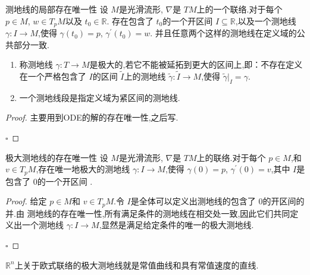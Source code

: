 \documentclass[../../几何与拓扑.tex]{subfiles}
\begin{document}
\begin{theorem}{测地线的局部存在唯一性}
    设 \(  M  \)是光滑流形, \(   \nabla   \)是 \(  TM  \)上的一个联络.对于每个 \(  p \in M  \), \(  w \in T_{p}M  \)以及 \(  t_0 \in \mathbb{R}   \).
    存在包含了 \(  t_0  \)的一个开区间 \(  I\subseteq \mathbb{R}   \),以及一个测地线 \(   \gamma :I\to M  \),使得 \(   \gamma \left( t_0 \right)= p   \), \(   \gamma ^{\prime} \left( t_0 \right)= w   \).
    并且任意两个这样的测地线在定义域的公共部分一致.           
\end{theorem}


\begin{definition}
    \begin{enumerate}
        \item 称测地线 \(   \gamma :T\to M  \)是极大的,若它不能被延拓到更大的区间上,即：不存在定义在一个严格包含了 \(  I  \)的区间 \(  \tilde{I}  \)上的测地线 \(   \tilde{\gamma} : \tilde{I}\to M  \),使得
         \(   \tilde{\gamma} |_{I} =   \gamma   \).
         \item 一个测地线段是指定义域为紧区间的测地线.     
    \end{enumerate}
    
\end{definition}

\begin{proof}
    主要用到ODE的解的存在唯一性,之后写.

    \hfill $\square$
\end{proof}


\begin{corollary}{极大测地线的存在唯一性}
    设 \(  M  \)是光滑流形, \(   \nabla   \)是 \(  TM  \)上的联络.对于每个 \(  p \in M  \),和 \(  v \in T_{p}M  \),存在唯一地极大的测地线 \(   \gamma : I \to M  \),使得 \(   \gamma \left( 0 \right)= p   \), \(   \gamma ^{\prime} \left( 0 \right) =  v   \),其中 \(  I  \)是包含了 \(  0  \)的一个开区间  .        
\end{corollary}

\begin{proof}
    给定 \(  p \in M  \)和 \(   v \in T_{p}M  \).令 \(  I  \)是全体可以定义出测地线的包含了 \(  0  \)的开区间的并.由
    测地线的存在唯一性,所有满足条件的测地线在相交处一致,因此它们共同定义出一个测地线 \(   \gamma : I\to M  \),显然是满足给定条件的唯一的极大测地线.     

    \hfill $\square$
\end{proof}


\begin{example}
    \(  \mathbb{R} ^{n}  \)上关于欧式联络的极大测地线就是常值曲线和具有常值速度的直线. 
\end{example}
\end{document}
